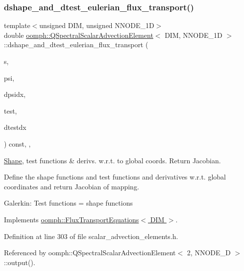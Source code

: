 \subsubsection{\texorpdfstring{dshape\+\_\+and\+\_\+dtest\+\_\+eulerian\+\_\+flux\+\_\+transport()}{dshape\_and\_dtest\_eulerian\_flux\_transport()}}
{\footnotesize\ttfamily template$<$unsigned D\+IM, unsigned N\+N\+O\+D\+E\+\_\+1D$>$ \\
double \hyperlink{classoomph_1_1QSpectralScalarAdvectionElement}{oomph\+::\+Q\+Spectral\+Scalar\+Advection\+Element}$<$ D\+IM, N\+N\+O\+D\+E\+\_\+1D $>$\+::dshape\+\_\+and\+\_\+dtest\+\_\+eulerian\+\_\+flux\+\_\+transport (\begin{DoxyParamCaption}\item[{const \hyperlink{classoomph_1_1Vector}{Vector}$<$ double $>$ \&}]{s,  }\item[{\hyperlink{classoomph_1_1Shape}{Shape} \&}]{psi,  }\item[{\hyperlink{classoomph_1_1DShape}{D\+Shape} \&}]{dpsidx,  }\item[{\hyperlink{classoomph_1_1Shape}{Shape} \&}]{test,  }\item[{\hyperlink{classoomph_1_1DShape}{D\+Shape} \&}]{dtestdx }\end{DoxyParamCaption}) const\hspace{0.3cm}{\ttfamily [inline]}, {\ttfamily [protected]}, {\ttfamily [virtual]}}



\hyperlink{classoomph_1_1Shape}{Shape}, test functions \& derivs. w.\+r.\+t. to global coords. Return Jacobian. 

Define the shape functions and test functions and derivatives w.\+r.\+t. global coordinates and return Jacobian of mapping.

Galerkin\+: Test functions = shape functions 

Implements \hyperlink{classoomph_1_1FluxTransportEquations_a9bdf6ab17431bcac6eac11bce917cdde}{oomph\+::\+Flux\+Transport\+Equations$<$ D\+I\+M $>$}.



Definition at line 303 of file scalar\+\_\+advection\+\_\+elements.\+h.



Referenced by oomph\+::\+Q\+Spectral\+Scalar\+Advection\+Element$<$ 2, N\+N\+O\+D\+E\+\_\+D $>$\+::output().

\mbox{\label{classoomph_1_1QSpectralScalarAdvectionElement_ad594e0a382ee5e10e50cedf75215f40e}} 
